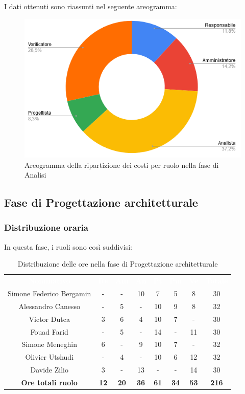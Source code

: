 I dati ottenuti sono riassunti nel seguente areogramma:
\begin{figure}[H]
\centering
\includegraphics[scale=0.60]{img/grafici/torta_fase_analisi_prospetto_economico.png}
\caption{Areogramma della ripartizione dei costi per ruolo nella fase di Analisi}
\end{figure}


\subsection{Fase di Progettazione architetturale}
\subsubsection{Distribuzione oraria}
In questa fase, i ruoli sono così suddivisi:
\begin{table}[H]
\centering\renewcommand{\arraystretch}{1.5}
\caption{Distribuzione delle ore nella fase di Progettazione architetturale}
\vspace{0.2cm}
\begin{tabular}{ c | c | c | c | c | c | c | c }
\rowcolor{redafk}
\textcolor{white}{\textbf{Nominativo}} & \textcolor{white}{\textbf{Re}} & 
\textcolor{white}{\textbf{Am}} & \textcolor{white}{\textbf{An}} &
\textcolor{white}{\textbf{Pt}} & \textcolor{white}{\textbf{Pm}} &
\textcolor{white}{\textbf{Ve}} & \textcolor{white}{\textbf{Totale}} \\
Simone Federico Bergamin & - & - & 10 & 7 & 5 & 8 & 30 \\
Alessandro Canesso & - & 5 & - & 10 & 9 & 8 & 32 \\
Victor Dutca & 3 & 6 & 4 & 10 & 7 & - & 30 \\
Fouad Farid	& - & 5 & - & 14 & - & 11 & 30 \\
Simone Meneghin & 6 & - & 9 & 10 & 7 & - & 32 \\
Olivier Utshudi & - & 4 & - & 10 & 6 & 12 & 32 \\
Davide Zilio & 3 & - & 13 & - & - & 14 & 30 \\
\rowcolor{lastrowcolor}
\textbf{Ore totali ruolo} & \textbf{12} & \textbf{20} & \textbf{36} & \textbf{61} & \textbf{34} & \textbf{53} & \textbf{216} \\
\end{tabular}
\end{table}

